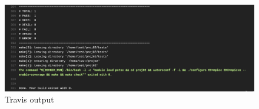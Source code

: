 \documentclass[12 pt, final]{article}
\begin{document}
\begin{itemize}
\begin{figure}[H]
        \label{fig:travis}
        \end{figure}
                  \begin{figure}[H]
        \centering
          \includegraphics[width=.99\linewidth]{figures/travis6.png}
          \caption{Travis output}
        \label{fig:travis}
        \end{figure}
\end{itemize}
\end{document}
